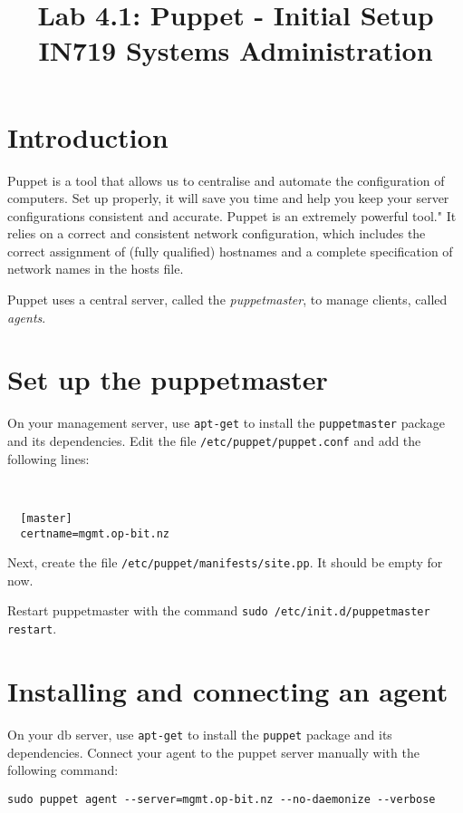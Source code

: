 \documentclass{article}
\begin{document}
\title{Lab 4.1: Puppet - Initial Setup \\ IN719 Systems Administration}
\date{}
\maketitle

\section*{Introduction}
Puppet is a tool that allows us to centralise and automate the configuration of computers.  Set up properly, it will save you time and help you keep your server configurations consistent and accurate.  Puppet is an extremely powerful tool." It relies on a correct and consistent network configuration, which includes the correct assignment of (fully qualified) hostnames and a complete specification of network names in the hosts file.

Puppet uses a central server, called the \emph{puppetmaster}, to manage clients, called \emph{agents}.

\section{Set up the puppetmaster}
On your management server, use \texttt{apt-get} to install the \texttt{puppetmaster} package and its dependencies.  Edit the file \texttt{/etc/puppet/puppet.conf} and add the following lines:

\
\begin{verbatim}
  [master]
  certname=mgmt.op-bit.nz
\end{verbatim}

Next, create the file \texttt{/etc/puppet/manifests/site.pp}.  It should be empty for now.

Restart puppetmaster with the command \texttt{sudo /etc/init.d/puppetmaster restart}.

\section{Installing and connecting an agent}
On your db server, use \texttt{apt-get} to install the \texttt{puppet} package and its dependencies.  Connect your agent to the puppet server manually with the following command:

\begin{verbatim}
sudo puppet agent --server=mgmt.op-bit.nz --no-daemonize --verbose
\end{verbatim}
\end{document}
